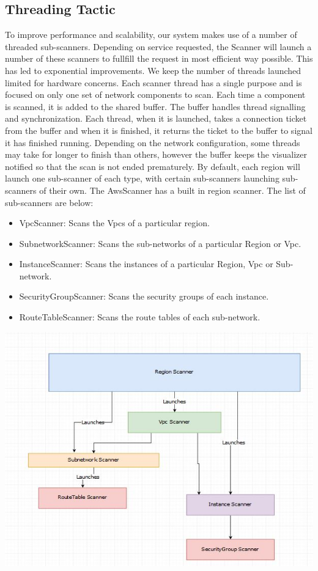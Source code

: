 \documentclass[hidelinks,a4paper,12pt]{article}
\begin{document}
\subsection{Threading Tactic}
To improve performance and scalability, our system makes use of a number of threaded sub-scanners. Depending on service requested, the Scanner will launch a number of these scanners to fullfill the request in most efficient way possible.
\newline
This has led to exponential improvements. We keep the number of threads launched limited for hardware concerns. Each scanner thread has a single purpose and is focused on only one set of network components to scan. Each time a component is scanned, it is added to the shared buffer. The buffer handles thread signalling and synchronization. Each thread, when it is launched, takes a connection ticket from the buffer and when it is finished, it returns the ticket to the buffer to signal it has finished running. Depending on the network configuration, some threads may take for longer to finish than others, however the buffer keeps the visualizer notified so that the scan is not ended prematurely. By default, each region will launch one sub-scanner of each type, with certain sub-scanners launching sub-scanners of their own. 
The AwsScanner has a built in region scanner.
\newpage
The list of sub-scanners are below:
\begin{itemize} 
\item VpcScanner: Scans the Vpcs of a particular region.
\item SubnetworkScanner: Scans the sub-networks of a particular Region or Vpc.
\item InstanceScanner: Scans the instances of a particular Region, Vpc or Sub-network.
\item SecurityGroupScanner: Scans the security groups of each instance.
\item RouteTableScanner: Scans the route tables of each sub-network.
\end{itemize}



\includegraphics[width=1.00\textwidth]{./images/threads.jpg}\\[0.4cm] 
\end{document}
